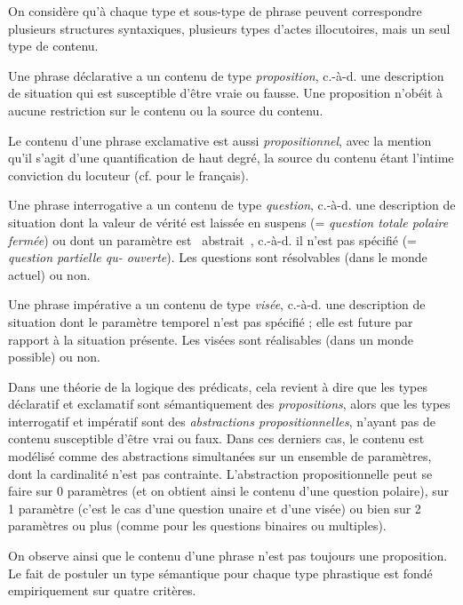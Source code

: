 On considère qu'à chaque type et sous-type de phrase peuvent correspondre plusieurs structures syntaxiques, plusieurs types d'actes illocutoires, mais un seul type de contenu. 

Une phrase déclarative a un contenu de type \textit{proposition}, c.-à-d. une description de situation qui est susceptible d'être vraie ou fausse. Une proposition n'obéit à aucune restriction sur le contenu ou la source du contenu.

Le contenu d'une phrase exclamative est aussi \textit{propositionnel}, avec la mention qu'il s'agit d'une quantification de haut degré, la source du contenu étant l'intime conviction du locuteur (cf. \citet{Marandin2008} pour le français).

Une phrase interrogative a un contenu de type \textit{question}, c.-à-d. une description de situation dont la valeur de vérité est laissée en suspens (= \textit{question totale {\textbar} polaire {\textbar} fermée}) ou dont un paramètre est {\guillemotleft}~abstrait~{\guillemotright}, c.-à-d. il n'est pas spécifié (= \textit{question partielle {\textbar} qu- {\textbar} ouverte}). Les questions sont résolvables (dans le monde actuel) ou non.

Une phrase impérative a un contenu de type \textit{visée}, c.-à-d. une description de situation dont le paramètre temporel n'est pas spécifié ; elle est future par rapport à la situation présente. Les visées sont réalisables (dans un monde possible) ou non. 

Dans une théorie de la logique des prédicats, cela revient à dire que les types déclaratif et exclamatif sont sémantiquement des \textit{propositions}, alors que les types interrogatif et impératif sont des \textit{abstractions propositionnelles}, n'ayant pas de contenu susceptible d'être vrai ou faux. Dans ces derniers cas, le contenu est modélisé comme des abstractions simultanées sur un ensemble de paramètres, dont la cardinalité n'est pas contrainte. L'abstraction propositionnelle peut se faire sur 0 paramètres (et on obtient ainsi le contenu d'une question polaire), sur 1 paramètre (c'est le cas d'une question unaire et d'une visée) ou bien sur 2 paramètres ou plus (comme pour les questions binaires ou multiples).

On observe ainsi que le contenu d'une phrase n'est pas toujours une proposition. Le fait de postuler un type sémantique pour chaque type phrastique est fondé empiriquement sur quatre critères.

